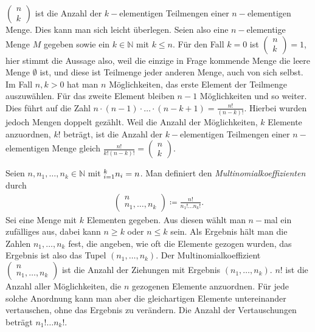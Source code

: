 \documentclass{book}
\let\sum\relax
\DeclareMathOperator*{\sum}{\raisebox{-3.5pt}{\scalebox{2}{\rotatebox{1}{{\bask Σ}}}}}
\begin{document}
$\left(\begin{array}{c}
n\\
k
\end{array}\right)$ ist die Anzahl der $k-$elementigen Teilmengen einer $n-$elementigen Menge. Dies kann man sich leicht überlegen. Seien also eine $n-$elementige Menge $M$ gegeben sowie ein $k\in\mathbb{N}$ mit $k\leq n$. Für den Fall $k = 0$ ist $\left(\begin{array}{c}
n\\
k
\end{array}\right) = 1$, hier stimmt die Aussage also, weil die einzige in Frage kommende Menge die leere Menge $\emptyset$ ist, und diese ist Teilmenge jeder anderen Menge, auch von sich selbst. Im Fall $n, k>0$ hat man $n$ Möglichkeiten, das erste Element der Teilmenge auszuwählen. Für das zweite Element bleiben $n - 1$ Möglichkeiten und so weiter. Dies führt auf die Zahl $n\cdot\left(n - 1\right)\cdot\dotsc\cdot\left(n - k + 1\right) = \frac{n!}{\left(n - k\right)!}$. Hierbei wurden jedoch Mengen doppelt gezählt. Weil die Anzahl der Möglichkeiten, $k$ Elemente anzuordnen, $k!$ beträgt, ist die Anzahl der $k-$elementigen Teilmengen einer $n-$elementigen Menge gleich $\frac{n!}{k!\left(n - k\right)!} = \left(\begin{array}{c}
n\\
k
\end{array}\right)$.

Seien $n, n_1, \dotsc, n_k\in\mathbb{N}$ mit $\sum_{i = 1}^{k}n_i = n$. Man definiert den \textit{Multinomialkoeffizienten} durch
%
\begin{eqnarray}
\left(\begin{array}{c}
n\\
n_1, \dotsc, n_k
\end{array}\right) \coloneqq \frac{n!}{n_1!\dotsc n_k!}.\label{def:multinomialkoeffizient}
\end{eqnarray}
%
Sei eine Menge mit $k$ Elementen gegeben. Aus diesen wählt man $n-$mal ein zufälliges aus, dabei kann $n\geq k$ oder $n\leq k$ sein. Als Ergebnis hält man die Zahlen $n_1, \dotsc, n_k$ fest, die angeben, wie oft die Elemente gezogen wurden, das Ergebnis ist also das Tupel $\left(n_1, \dotsc, n_k\right)$. Der Multinomialkoeffizient $\left(\begin{array}{c}
n\\
n_1, \dotsc, n_k
\end{array}\right)$ ist die Anzahl der Ziehungen mit Ergebnis $\left(n_1, \dotsc, n_k\right)$. $n!$ ist die Anzahl aller Möglichkeiten, die $n$ gezogenen Elemente anzuordnen. Für jede solche Anordnung kann man aber die gleichartigen Elemente untereinander vertauschen, ohne das Ergebnis zu verändern. Die Anzahl der Vertauschungen beträgt $n_1!\dotsc n_k!$.
\end{document}

